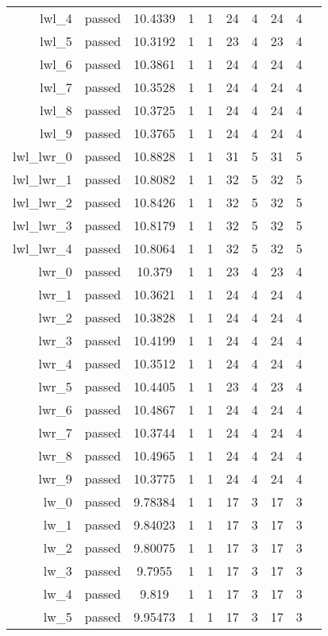 \begin{longtable}{r|ccccccccc}
    lwl\_4 & passed & 10.4339 & 1 & 1 & 24 & 4 & 24 & 4 \\
    lwl\_5 & passed & 10.3192 & 1 & 1 & 23 & 4 & 23 & 4 \\
    lwl\_6 & passed & 10.3861 & 1 & 1 & 24 & 4 & 24 & 4 \\
    lwl\_7 & passed & 10.3528 & 1 & 1 & 24 & 4 & 24 & 4 \\
    lwl\_8 & passed & 10.3725 & 1 & 1 & 24 & 4 & 24 & 4 \\
    lwl\_9 & passed & 10.3765 & 1 & 1 & 24 & 4 & 24 & 4 \\
    lwl\_lwr\_0 & passed & 10.8828 & 1 & 1 & 31 & 5 & 31 & 5 \\
    lwl\_lwr\_1 & passed & 10.8082 & 1 & 1 & 32 & 5 & 32 & 5 \\
    lwl\_lwr\_2 & passed & 10.8426 & 1 & 1 & 32 & 5 & 32 & 5 \\
    lwl\_lwr\_3 & passed & 10.8179 & 1 & 1 & 32 & 5 & 32 & 5 \\
    lwl\_lwr\_4 & passed & 10.8064 & 1 & 1 & 32 & 5 & 32 & 5 \\
    lwr\_0 & passed & 10.379 & 1 & 1 & 23 & 4 & 23 & 4 \\
    lwr\_1 & passed & 10.3621 & 1 & 1 & 24 & 4 & 24 & 4 \\
    lwr\_2 & passed & 10.3828 & 1 & 1 & 24 & 4 & 24 & 4 \\
    lwr\_3 & passed & 10.4199 & 1 & 1 & 24 & 4 & 24 & 4 \\
    lwr\_4 & passed & 10.3512 & 1 & 1 & 24 & 4 & 24 & 4 \\
    lwr\_5 & passed & 10.4405 & 1 & 1 & 23 & 4 & 23 & 4 \\
    lwr\_6 & passed & 10.4867 & 1 & 1 & 24 & 4 & 24 & 4 \\
    lwr\_7 & passed & 10.3744 & 1 & 1 & 24 & 4 & 24 & 4 \\
    lwr\_8 & passed & 10.4965 & 1 & 1 & 24 & 4 & 24 & 4 \\
    lwr\_9 & passed & 10.3775 & 1 & 1 & 24 & 4 & 24 & 4 \\
    lw\_0 & passed & 9.78384 & 1 & 1 & 17 & 3 & 17 & 3 \\
    lw\_1 & passed & 9.84023 & 1 & 1 & 17 & 3 & 17 & 3 \\
    lw\_2 & passed & 9.80075 & 1 & 1 & 17 & 3 & 17 & 3 \\
    lw\_3 & passed & 9.7955 & 1 & 1 & 17 & 3 & 17 & 3 \\
    lw\_4 & passed & 9.819 & 1 & 1 & 17 & 3 & 17 & 3 \\
    lw\_5 & passed & 9.95473 & 1 & 1 & 17 & 3 & 17 & 3 \\

\end{longtable}
